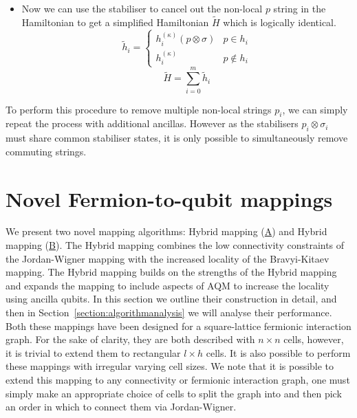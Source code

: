 \documentclass[pdftex,pra,aps,twocolumn,twoside]{revtex4-2}
\theoremstyle{plain}
\theoremstyle{note}
\newcommand\+{{\footnotesize \raisebox{0.3ex}{+}}}
\begin{document}
\begin{itemize}
\begin{equation}
    \label{eq:equivalent_to_original_hamiltonian}
    H^{(\kappa)}\ket{\tilde \psi}_{SA} = V (H \otimes I) \ket{\psi}_S \ket{0}_A
\end{equation}
\item Now we can use the stabiliser to cancel out the non-local $p$ string in the Hamiltonian to get a simplified Hamiltonian $\tilde H$ which is logically identical.
\begin{equation}
   \tilde h_i = \begin{cases} h_i^{(\kappa)} (p \otimes \sigma)  &  p \in h_i \\ 
   h_i^{(\kappa)} & p \notin h_i \end{cases}
\end{equation}
\begin{equation}
    \tilde H = \sum_{i=0}^m \tilde h_i
\end{equation}
\end{itemize}
To perform this procedure to remove multiple non-local strings $p_i$, we can simply repeat the process with additional ancillas. However as the stabilisers $p_i \otimes \sigma_i$ must share common stabiliser states, it is only possible to simultaneously remove commuting strings. 

\section{Novel Fermion-to-qubit mappings}
We present two novel mapping algorithms: Hybrid mapping (\hyperref[section:Hybridmapping]{A}) and Hybrid\+ mapping (\hyperref[section:auxHybridmapping]{B}). The Hybrid mapping combines the low connectivity constraints of the Jordan-Wigner mapping with the increased locality of the Bravyi-Kitaev mapping. The Hybrid\+ mapping builds on the strengths of the Hybrid mapping and expands the mapping to include aspects of AQM \cite{Verstraete_2005, steudtner2019quantum} to increase the locality using ancilla qubits.
In this section we outline their construction in detail, and then in Section~\ref{section:algorithmanalysis} we will analyse their performance. 
Both these mappings have been designed for a square-lattice fermionic interaction graph. For the sake of clarity, they are both described with $n \times n$ cells, however, it is trivial to extend them to rectangular $l \times h$ cells. It is also possible to perform these mappings with irregular varying cell sizes. We note that it is possible to extend this mapping to any connectivity or fermionic interaction graph, one must simply make an appropriate choice of cells to split the graph into and then pick an order in which to connect them via Jordan-Wigner.
\end{document}

